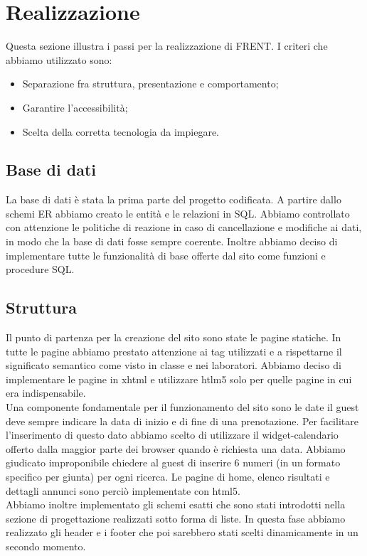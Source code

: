 \documentclass[1_relazione.tex]{subfiles}
\begin{document}
\section{Realizzazione}
Questa sezione illustra i passi per la realizzazione di FRENT.  I criteri che abbiamo utilizzato sono:
\begin{itemize}
\item Separazione fra struttura, presentazione e comportamento;
\item Garantire l'accessibilit\`{a};
\item Scelta della corretta tecnologia da impiegare.
\end{itemize}

\subsection{Base di dati}
La base di dati \`{e} stata la prima parte del progetto codificata. A partire dallo schemi ER abbiamo creato le entit\`{a} e le relazioni in SQL. Abbiamo controllato con attenzione le politiche di reazione in caso di cancellazione e modifiche ai dati, in modo che la base di dati fosse sempre coerente. Inoltre abbiamo deciso di implementare tutte le funzionalit\`{a} di base offerte dal sito come funzioni e procedure SQL.

\subsection{Struttura}
Il punto di partenza per la creazione del sito sono state le pagine statiche. In tutte le pagine abbiamo prestato attenzione ai tag utilizzati e a rispettarne il significato semantico come visto in classe e nei laboratori. Abbiamo deciso di implementare le pagine in xhtml e utilizzare htlm5 solo per quelle pagine in cui era indispensabile.\\ Una componente fondamentale per il funzionamento del sito sono le date il guest deve sempre indicare la data di inizio e di fine di una prenotazione. Per facilitare l'inserimento di questo dato abbiamo scelto di utilizzare il widget-calendario offerto dalla maggior parte dei browser quando è richiesta una data. Abbiamo giudicato improponibile chiedere al guest di inserire 6 numeri (in un formato specifico per giunta) per ogni ricerca. Le pagine di home, elenco risultati e dettagli annunci sono perci\`{o} implementate con html5. \\
Abbiamo inoltre implementato gli schemi esatti che sono stati introdotti nella sezione di progettazione realizzati sotto forma di liste. In questa fase abbiamo realizzato gli header e i footer che poi sarebbero stati scelti dinamicamente in un secondo momento. \\
\end{document}
